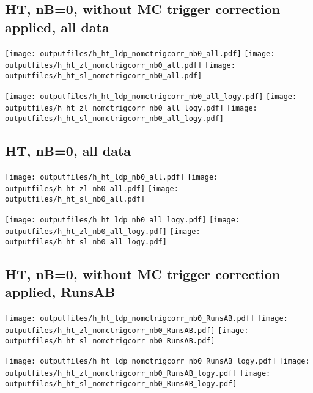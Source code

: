 \documentclass[11pt]{article}
\begin{document}
   \clearpage
    \subsection{ HT, nB=0, without MC trigger correction applied, all data}

    \noindent
    \texttt{[image: outputfiles/h\_ht\_ldp\_nomctrigcorr\_nb0\_all.pdf]}
    \texttt{[image: outputfiles/h\_ht\_zl\_nomctrigcorr\_nb0\_all.pdf]}
    \texttt{[image: outputfiles/h\_ht\_sl\_nomctrigcorr\_nb0\_all.pdf]}

    \noindent
    \texttt{[image: outputfiles/h\_ht\_ldp\_nomctrigcorr\_nb0\_all\_logy.pdf]}
    \texttt{[image: outputfiles/h\_ht\_zl\_nomctrigcorr\_nb0\_all\_logy.pdf]}
    \texttt{[image: outputfiles/h\_ht\_sl\_nomctrigcorr\_nb0\_all\_logy.pdf]}


    \subsection{ HT, nB=0, all data}

    \noindent
    \texttt{[image: outputfiles/h\_ht\_ldp\_nb0\_all.pdf]}
    \texttt{[image: outputfiles/h\_ht\_zl\_nb0\_all.pdf]}
    \texttt{[image: outputfiles/h\_ht\_sl\_nb0\_all.pdf]}

    \noindent
    \texttt{[image: outputfiles/h\_ht\_ldp\_nb0\_all\_logy.pdf]}
    \texttt{[image: outputfiles/h\_ht\_zl\_nb0\_all\_logy.pdf]}
    \texttt{[image: outputfiles/h\_ht\_sl\_nb0\_all\_logy.pdf]}




    \subsection{ HT, nB=0, without MC trigger correction applied, RunsAB}

    \noindent
    \texttt{[image: outputfiles/h\_ht\_ldp\_nomctrigcorr\_nb0\_RunsAB.pdf]}
    \texttt{[image: outputfiles/h\_ht\_zl\_nomctrigcorr\_nb0\_RunsAB.pdf]}
    \texttt{[image: outputfiles/h\_ht\_sl\_nomctrigcorr\_nb0\_RunsAB.pdf]}

    \noindent
    \texttt{[image: outputfiles/h\_ht\_ldp\_nomctrigcorr\_nb0\_RunsAB\_logy.pdf]}
    \texttt{[image: outputfiles/h\_ht\_zl\_nomctrigcorr\_nb0\_RunsAB\_logy.pdf]}
    \texttt{[image: outputfiles/h\_ht\_sl\_nomctrigcorr\_nb0\_RunsAB\_logy.pdf]}
\end{document}
